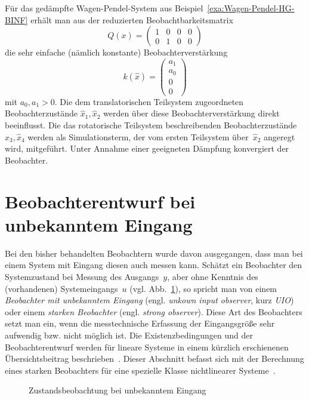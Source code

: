 \begin{example}
\label{exa:Wagen-Pendel-HG-MPPI}Für das gedämpfte Wagen-Pendel-System
aus Beispiel~\ref{exa:Wagen-Pendel-HG-BINF} erhält man aus der reduzierten
Beobachtbarkeitsmatrix
\[
Q(x)=\left(\begin{array}{cccc}
1 & 0 & 0 & 0\\
0 & 1 & 0 & 0
\end{array}\right)
\]
die sehr einfache (nämlich konstante) Beobachterverstärkung
\[
k(\hat{x})=\left(\begin{array}{c}
a_{1}\\
a_{0}\\
0\\
0
\end{array}\right)
\]
mit $a_{0},a_{1}>0$. Die dem translatorischen Teilsystem zugeordneten
Beobachterzustände $\hat{x}_{1},\hat{x}_{2}$ werden über diese Beobachterverstärkung
direkt beeinflusst. Die das rotatorische Teilsystem beschreibenden
Beobachterzustände $\hat{x}_{3},\hat{x}_{4}$ werden als Simulationsterm,
der vom ersten Teilsystem über~$\hat{x}_{2}$ angeregt wird, mitgeführt.
Unter Annahme einer geeigneten Dämpfung konvergiert der Beobachter.
\end{example}

\section{Beobachterentwurf bei unbekanntem Eingang}

Bei den bisher behandelten Beobachtern wurde davon ausgegangen, dass
man bei einem System mit Eingang diesen auch messen kann. Schätzt
ein Beobachter den Systemzustand bei Messung des Ausgangs~$y$, aber
ohne Kenntnis des (vorhandenen) Systemeingangs~$u$ (vgl. Abb.~\ref{fig:uio-struktur}),
so spricht man von einem \emph{Beobachter mit unbekanntem Eingang}
(engl. \emph{unkown input observer}, kurz \emph{UIO}) oder einem \emph{starken
Beobachter} (engl. \emph{strong observer}). Diese Art des Beobachters
setzt man ein, wenn die messtechnische Erfassung der Eingangsgröße
sehr aufwendig bzw. nicht möglich ist. Die Existenzbedingungen und
der Beobachterentwurf werden für lineare Systeme in einem kürzlich
erschienenen Übersichtsbeitrag beschrieben~\cite{lunze2017at}. Dieser
Abschnitt befasst sich mit der Berechnung eines starken Beobachters
für eine spezielle Klasse nicht\-linearer Systeme~\cite{moreno2000UnknownInput}.

\begin{figure}
\begin{centering}
\resizebox{0.55\textwidth}{!}{}
\par\end{centering}
\caption{Zustandsbeobachtung bei unbekanntem Eingang\label{fig:uio-struktur}}

\end{figure}


